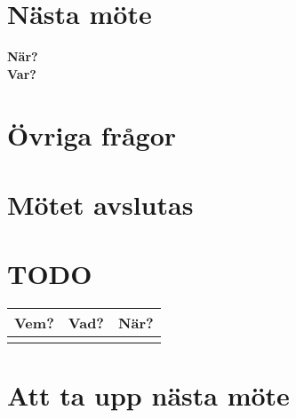 \documentclass[9pt]{article}
\begin{document}
\section{Nästa möte}
\textbf{När?} \\
\textbf{Var?} \\

\section{Övriga frågor}

\section{Mötet avslutas}


\appendix
\section{TODO}
\begin{tabular}{| p{3cm} | p{7.5cm} | p{3cm}|}
  \hline
  \textbf{Vem?} & \textbf{Vad?} & \textbf{När?} \\ \hline
  \textbf{} & \textbf{} & \textbf{} \\ \hline


  \end{tabular}
\section{Att ta upp nästa möte}
\end{document}
